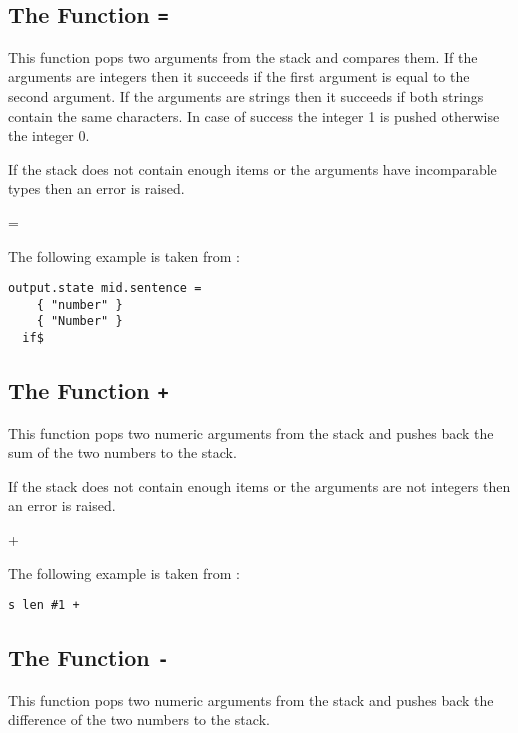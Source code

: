 \subsection{The Function \texttt{=}}%
\fctIndex{=}

This function pops two arguments from the stack and compares them.
If the arguments are integers then it succeeds if the first argument is
equal to the second argument. If the arguments are strings then it
succeeds if both strings contain the same characters. In case of
success the integer 1 is pushed otherwise the integer 0.

If the stack does not contain enough items or the arguments have
incomparable types then an error is raised.

\begin{BstFunction}{=}
\end{BstFunction}

The following example is taken from :

\begin{lstlisting}[language=bst]
    output.state mid.sentence =
    { "number" }
    { "Number" }
  if$
\end{lstlisting}


\subsection{The Function \texttt{+}}%
\fctIndex{+}

This function pops two numeric arguments from the stack and
pushes back the sum of the two numbers to the stack.

If the stack does not contain enough items or the arguments are not
integers then an error is raised.

\begin{BstFunction}{+}
\end{BstFunction}

The following example is taken from :

\begin{lstlisting}[language=bst]
    s len #1 +
\end{lstlisting}


\subsection{The Function \texttt{-}}%
\fctIndex{-}

This function pops two numeric arguments from the stack and
pushes back the difference of the two numbers to the stack.

